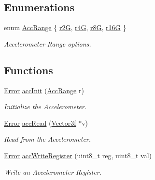 \subsection*{Enumerations}
\begin{DoxyCompactItemize}
\item 
enum \hyperlink{group__acc_ga3d56e56c162b045de727006a11880324}{Acc\-Range} \{ \hyperlink{group__acc_gga3d56e56c162b045de727006a11880324a4a2974e8d1854463238577802e1253f4}{r2\-G}, 
\hyperlink{group__acc_gga3d56e56c162b045de727006a11880324a9b1fcfa48172993a069412d5eecd6689}{r4\-G}, 
\hyperlink{group__acc_gga3d56e56c162b045de727006a11880324ac131fa2bab37bb0c8e152a91ce2b6bcf}{r8\-G}, 
\hyperlink{group__acc_gga3d56e56c162b045de727006a11880324af3fee93850514c5235659c573611f183}{r16\-G}
 \}
\begin{DoxyCompactList}\small\item\em Accelerometer Range options. \end{DoxyCompactList}\end{DoxyCompactItemize}
\subsection*{Functions}
\begin{DoxyCompactItemize}
\item 
\hyperlink{group__error_ga2c3e4bb40f36b262a5214e2da2bca9c5}{Error} \hyperlink{group__acc_ga7674eb1b940f183abe5e0b0913a87613}{acc\-Init} (\hyperlink{group__acc_ga3d56e56c162b045de727006a11880324}{Acc\-Range} r)
\begin{DoxyCompactList}\small\item\em Initialize the Accelerometer. \end{DoxyCompactList}\item 
\hyperlink{group__error_ga2c3e4bb40f36b262a5214e2da2bca9c5}{Error} \hyperlink{group__acc_ga4dd55defcab17af4ecc29562a5a28ab3}{acc\-Read} (\hyperlink{struct_vector3f}{Vector3f} $\ast$v)
\begin{DoxyCompactList}\small\item\em Read from the Accelerometer. \end{DoxyCompactList}\item 
\hyperlink{group__error_ga2c3e4bb40f36b262a5214e2da2bca9c5}{Error} \hyperlink{group__acc_ga277bcee14b8033f6da9790a8afe03348}{acc\-Write\-Register} (uint8\-\_\-t reg, uint8\-\_\-t val)
\begin{DoxyCompactList}\small\item\em Write an Accelerometer Register. \end{DoxyCompactList}\end{DoxyCompactItemize}
